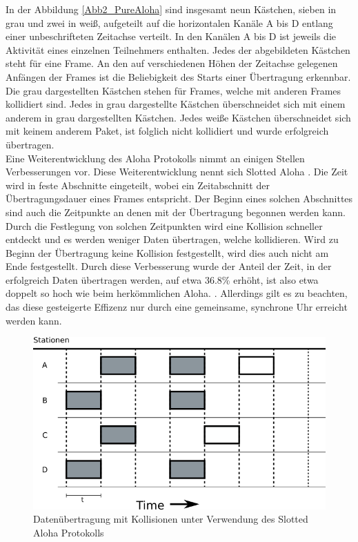 In der Abbildung \ref{Abb2_PureAloha} sind insgesamt neun Kästchen, sieben in grau und zwei in weiß, aufgeteilt auf die horizontalen Kanäle A bis D entlang einer unbeschrifteten Zeitachse verteilt. In den Kanälen A bis D ist jeweils die Aktivität eines einzelnen Teilnehmers enthalten. Jedes der abgebildeten Kästchen steht für eine Frame. An den auf verschiedenen Höhen der Zeitachse gelegenen Anfängen der Frames ist die Beliebigkeit des Starts einer Übertragung erkennbar. Die grau dargestellten Kästchen stehen für Frames, welche mit anderen Frames kollidiert sind. Jedes in grau dargestellte Kästchen überschneidet sich mit einem anderem in grau dargestellten Kästchen. Jedes weiße Kästchen überschneidet sich mit keinem anderem Paket, ist folglich nicht kollidiert und wurde erfolgreich übertragen.\\
Eine Weiterentwicklung des Aloha Protokolls nimmt an einigen Stellen Verbesserungen vor. Diese Weiterentwicklung nennt sich Slotted Aloha \cite{Back_AlohaPure}. Die Zeit wird in feste Abschnitte eingeteilt, wobei ein Zeitabschnitt der Übertragungsdauer eines Frames entspricht. Der Beginn eines solchen Abschnittes sind auch die Zeitpunkte an denen mit der Übertragung begonnen werden kann. Durch die Festlegung von solchen Zeitpunkten wird eine Kollision schneller entdeckt und es werden weniger Daten übertragen, welche kollidieren. Wird zu Beginn der Übertragung keine Kollision festgestellt, wird dies auch nicht am Ende festgestellt. Durch diese Verbesserung wurde der Anteil der Zeit, in der erfolgreich Daten übertragen werden, auf etwa 36.8\% erhöht, ist also etwa doppelt so hoch wie beim herkömmlichen Aloha. \cite{Back_AlohaPure}. Allerdings gilt es zu beachten, das diese gesteigerte Effizenz nur durch eine gemeinsame, synchrone Uhr erreicht werden kann.\\
\begin{figure}[h!]
	\centering
	\includegraphics[scale=0.6]{img/ZeichnungExportSlotted3.png}
	\caption{Datenübertragung mit Kollisionen unter Verwendung des Slotted Aloha Protokolls}
	\label{Abb_SlottedAloha}
\end{figure}
